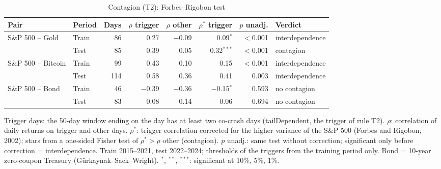 \begin{table}[t]
\centering
\scriptsize
\setlength{\tabcolsep}{3.5pt}
\caption{Contagion (T2): Forbes--Rigobon test}
\label{tab:econ_t2}
\begin{tabular}{llrrrrrl}
\toprule
Pair & Period & Days & $\rho$ trigger & $\rho$ other & $\rho^{*}$ trigger & $p$ unadj. & Verdict \\
\midrule
S\&P 500 -- Gold & Train & 86 & 0.27 & $-$0.09 & 0.09$^{*}$ & $<$0.001 & interdependence \\
 & Test & 85 & 0.39 & 0.05 & 0.32$^{***}$ & $<$0.001 & contagion \\
S\&P 500 -- Bitcoin & Train & 99 & 0.43 & 0.10 & 0.15 & $<$0.001 & interdependence \\
 & Test & 114 & 0.58 & 0.36 & 0.41 & 0.003 & interdependence \\
S\&P 500 -- Bond & Train & 46 & $-$0.39 & $-$0.36 & $-$0.15$^{*}$ & 0.593 & no contagion \\
 & Test & 83 & 0.08 & 0.14 & 0.06 & 0.694 & no contagion \\
\bottomrule
\end{tabular}
\par\smallskip
\parbox{\linewidth}{\footnotesize Trigger days: the 50-day window ending on the day has at least two co-crash days (tailDependent, the trigger of rule T2). $\rho$: correlation of daily returns on trigger and other days. $\rho^{*}$: trigger correlation corrected for the higher variance of the S\&P 500 (Forbes and Rigobon, 2002); stars from a one-sided Fisher test of $\rho^{*} > \rho$ other (contagion). $p$ unadj.: same test without correction; significant only before correction = interdependence. Train 2015--2021, test 2022--2024; thresholds of the triggers from the training period only. Bond = 10-year zero-coupon Treasury (G\"urkaynak--Sack--Wright). $^{*}$, $^{**}$, $^{***}$: significant at 10\%, 5\%, 1\%.}
\end{table}

